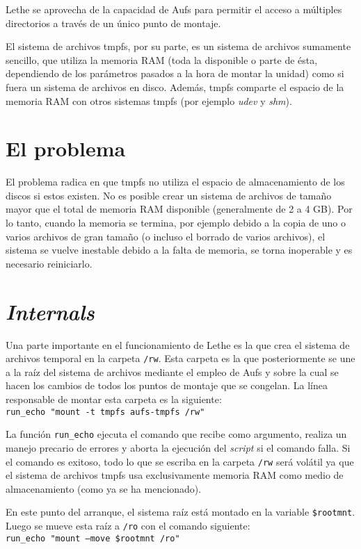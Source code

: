 \documentclass[final,narroweqnarray,inline,twoside]{ieee}
\begin{document}
Lethe se aprovecha de la capacidad de Aufs para permitir el acceso a múltiples directorios a través de un único punto de
montaje.

El sistema de archivos tmpfs, por su parte, es un sistema de archivos sumamente sencillo, que utiliza la memoria RAM (toda la
disponible o parte de ésta, dependiendo de los parámetros pasados a la hora de montar la unidad) como si fuera un sistema de
archivos en disco. Además, tmpfs comparte el espacio de la memoria RAM con otros sistemas tmpfs (por ejemplo \textit{udev} y
\textit{shm}).

\section{El problema}
El problema radica en que tmpfs no utiliza el espacio de almacenamiento de los discos si estos existen. No es
posible crear un sistema de archivos de tamaño mayor que el total de memoria RAM disponible (generalmente de 2 a 4 GB). 
Por lo tanto, cuando la memoria se termina, por ejemplo debido a la copia de uno o varios archivos de gran tamaño (o incluso
el borrado de varios archivos), el sistema se vuelve inestable debido a la falta de memoria, se torna inoperable y es
necesario reiniciarlo.

\section{\textit{Internals}}
Una parte importante en el funcionamiento de Lethe es la que crea el sistema de archivos temporal en la carpeta
\texttt{/rw}. Esta carpeta es la que posteriormente se une a la raíz del sistema de archivos mediante el empleo de Aufs y
sobre la cual se hacen los cambios de todos los puntos de montaje que se congelan.
La línea responsable de montar esta carpeta es la siguiente:
\\\indent\texttt{run\_echo "mount -t tmpfs aufs-tmpfs /rw"}

La función \texttt{run\_echo} ejecuta el comando que recibe como argumento, realiza un manejo precario de errores y aborta la
ejecución del \textit{script} si el comando falla. Si el comando es exitoso, todo lo que se escriba en la carpeta
\texttt{/rw} será
volátil ya que el sistema de archivos tmpfs usa exclusivamente memoria RAM como medio de almacenamiento (como ya se
ha mencionado).

En este punto del arranque, el sistema raíz está montado en la variable \texttt{\${rootmnt}}. Luego se mueve esta
raíz a \texttt{/ro}
con el comando siguiente:
\\\indent\texttt{run\_echo "mount --move \${rootmnt} /ro"}
\end{document}
